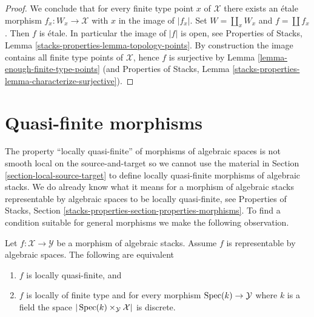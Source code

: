 \begin{proof}
\medskip\noindent
We conclude that for every finite type point $x$ of $\mathcal{X}$ there
exists an \'etale morphism $f_x : W_x \to \mathcal{X}$ with $x$ in the
image of $|f_x|$. Set $W = \coprod_x W_x$ and $f = \coprod f_x$. Then $f$
is \'etale. In particular the image of $|f|$ is open, see
Properties of Stacks, Lemma \ref{stacks-properties-lemma-topology-points}.
By construction the image contains all finite type points of $\mathcal{X}$,
hence $f$ is surjective by
Lemma \ref{lemma-enough-finite-type-points} (and
Properties of Stacks, Lemma
\ref{stacks-properties-lemma-characterize-surjective}).
\end{proof}








\section{Quasi-finite morphisms}
\label{section-quasi-finite}

\noindent
The property ``locally quasi-finite'' of morphisms of algebraic spaces
is not smooth local on the source-and-target so we cannot use the material in
Section \ref{section-local-source-target}
to define locally quasi-finite morphisms of algebraic stacks.
We do already know what it means for a morphism of algebraic stacks
representable by algebraic spaces to be locally quasi-finite, see
Properties of Stacks, Section
\ref{stacks-properties-section-properties-morphisms}.
To find a condition suitable for general morphisms we make the following
observation.

\begin{lemma}
\label{lemma-representable-by-spaces-quasi-finite}
Let $f : \mathcal{X} \to \mathcal{Y}$ be a morphism of algebraic stacks.
Assume $f$ is representable by algebraic spaces.
The following are equivalent
\begin{enumerate}
\item $f$ is locally quasi-finite, and
\item $f$ is locally of finite type and for every morphism
$\mathop{\rm Spec}(k) \to \mathcal{Y}$ where $k$ is a field the
space $|\mathop{\rm Spec}(k) \times_\mathcal{Y} \mathcal{X}|$ is discrete.
\end{enumerate}
\end{lemma}

